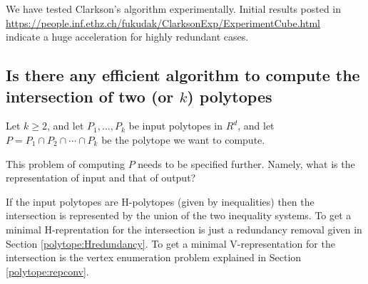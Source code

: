\documentclass[[a4paper,12pt]{article}
\begin{document}
We have tested Clarkson's algorithm \cite{c-mosga-94} 
 experimentally.  Initial results posted in 
\url{https://people.inf.ethz.ch/fukudak/ClarksonExp/ExperimentCube.html}\\
indicate a huge acceleration for highly redundant cases. 




\subsection{Is there any efficient algorithm to compute
the intersection of two (or $k$) polytopes}
\label{polytope:kintersection}

Let $k \ge 2$, and let $P_1, \ldots, P_k$ be input polytopes
in $R^d$, and let $P=P_1 \cap P_2 \cap \cdots \cap P_k$ be
the polytope we want to compute.

This problem of computing $P$ needs to be specified further.  Namely,
what is the representation of input and that of output?

If the input polytopes are H-polytopes (given by inequalities)
then the intersection is represented by the union of
the two inequality systems.  To get a minimal H-reprentation
for the intersection is just a redundancy removal given
in Section \ref{polytope:Hredundancy}.  To get a minimal V-representation
for the intersection is the vertex enumeration problem explained
in Section \ref{polytope:repconv}.
\end{document}
